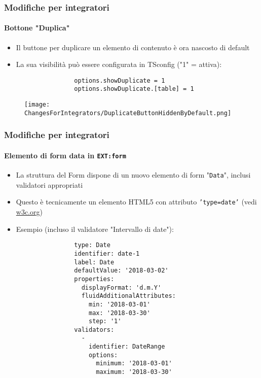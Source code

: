 \begin{frame}[fragile]
	\frametitle{Modifiche per integratori}
	\framesubtitle{Bottone "Duplica"}

	\lstset{basicstyle=\smaller\ttfamily}

	\begin{itemize}
		\item Il buttone per duplicare un elemento di contenuto è ora nascosto di default
		\item La sua visibilità può essere configurata in TSconfig ("1" = attiva):

			\begin{lstlisting}
				options.showDuplicate = 1
				options.showDuplicate.[table] = 1
			\end{lstlisting}

	\end{itemize}
	\vspace{-0.5cm}
	\begin{figure}
		\texttt{[image: ChangesForIntegrators/DuplicateButtonHiddenByDefault.png]}
	\end{figure}

\end{frame}


\begin{frame}[fragile]
	\frametitle{Modifiche per integratori}
	\framesubtitle{Elemento di form data in \texttt{EXT:form}}

	\lstset{basicstyle=\tiny\ttfamily}

	\begin{itemize}
		\item La struttura del Form dispone di un nuovo elemento di form "\texttt{Data}",
			inclusi validatori appropriati
		\item Questo è tecnicamente un elemento HTML5 con attributo \texttt{'type=date'}
			(vedi \href{https://www.w3.org/TR/2011/WD-html-markup-20110405/input.date.html}{w3c.org})
		\item Esempio (incluso il validatore "Intervallo di date"):

			\begin{lstlisting}
				type: Date
				identifier: date-1
				label: Date
				defaultValue: '2018-03-02'
				properties:
				  displayFormat: 'd.m.Y'
				  fluidAdditionalAttributes:
				    min: '2018-03-01'
				    max: '2018-03-30'
				    step: '1'
				validators:
				  -
				    identifier: DateRange
				    options:
				      minimum: '2018-03-01'
				      maximum: '2018-03-30'
			\end{lstlisting}

	\end{itemize}

\end{frame}

